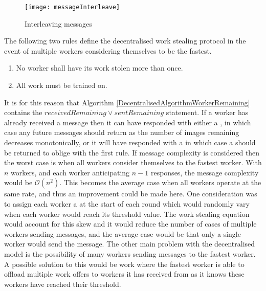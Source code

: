 \documentclass[12pt]{article}
\begin{document}
\begin{figure}[H]
  \centering
  \texttt{[image: messageInterleave]}
  \caption[]{Interleaving  messages}
  \label{messageInterleave}
\end{figure}

The following two rules define the decentralised work stealing protocol in the event of multiple workers considering themselves to be the fastest.

\begin{enumerate}
\item No worker shall have its work stolen more than once.
\item All work must be trained on.
\end{enumerate}

It is for this reason that Algorithm \ref{DecentralisedAlgorithmWorkerRemaining} contains the $receivedRemaining \lor sentRemaining$ statement. If a worker has already received a  message then it can have responded with either a , in which case any future messages should return  as the number of images remaining decreases monotonically, or it will have responded with a  in which case a  should be returned to oblige with the first rule.
\newline
\newline
If message complexity is considered then the worst case is when all workers consider themselves to the fastest worker. With $n$ workers, and each worker anticipating $n-1$ responses, the message complexity would be $\mathcal{O}(n^2)$. This becomes the average case when all workers operate at the same rate, and thus an improvement could be made here. One consideration was to assign each worker a  at the start of each round which would randomly vary when each worker would reach its threshold value. The work stealing equation would account for this skew and it would reduce the number of cases of multiple workers sending  messages, and the average case would be that only a single worker would send the  message. The other main problem with the decentralised model is the possibility of many workers sending  messages to the fastest worker. A possible solution to this would be work  where the fastest worker is able to offload multiple work offers to workers it has received  from as it knows these workers have reached their threshold.

\newpage
\end{document}
